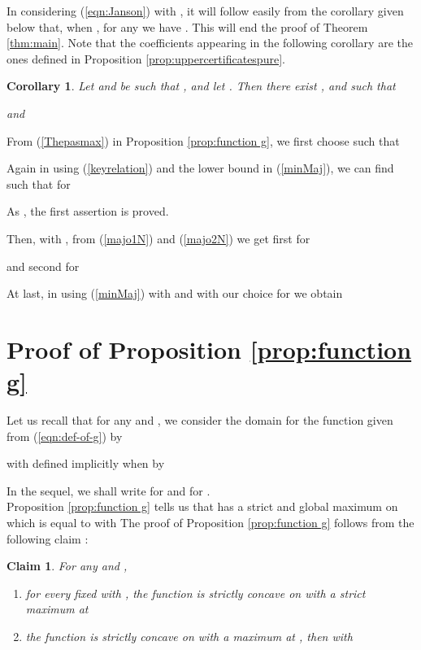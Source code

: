 \documentclass[aop,noinfoline]{imsart}
\newtheorem{corollary}[theorem]{Corollary}
\newtheorem{claim}[theorem]{Claim}
\renewcommand{\Box}{{\vrule width0.6ex height1em depth0cm}}
\newenvironment{proof}{\noindent{\bf Proof:}}{\hfill \Box}
\begin{document}
In considering (\ref{eqn:Janson}) with ,  it will follow easily from the  corollary  given below
that, when ,  for any  we have
. This will end the proof of Theorem \ref{thm:main}. Note that the coefficients  appearing in the following corollary are the ones defined in Proposition \ref{prop:uppercertificatespure}.
\begin{corollary}\label{upperbound}
Let  and  be such that , and let
. Then there exist
,  and  such that   


and 

\end{corollary}
\begin{proof} 
From  (\ref{Thepasmax}) in Proposition \ref{prop:function g}, we first choose  such that 
 
Again in using (\ref {keyrelation}) and   the lower bound in (\ref{minMaj}), we can find  such that for  

As , the first assertion is proved.


Then, with ,   from (\ref{majo1N}) and  (\ref{majo2N})  we get first for  

and second for  

At last, in using (\ref{minMaj}) with  and with our choice for  we obtain 




\end{proof}



 



\section{Proof of Proposition \ref{prop:function g}}\label{sec:technical}


Let us recall that  for any  and  ,  we consider the  domain   
  for the function  given from (\ref{eqn:def-of-g}) by  

   
 
 
 with   defined implicitly  when  by 
 
 In the sequel, we shall write  for  and  for .\\
 
  Proposition \ref{prop:function g} tells us that  has a  strict and global maximum on   which is equal to  with
 The proof of   Proposition \ref{prop:function g}  follows from  the  following claim :


\begin{claim}
\label{onevariableproof} For any  and  ,
 
 \begin{enumerate}
\item  for every fixed  with , the function 
 is strictly concave on  with a strict  maximum at 

\item the function   is strictly concave on  with a  maximum at  , then  with 
     
\end{enumerate}
\end{claim}
\end{document}
